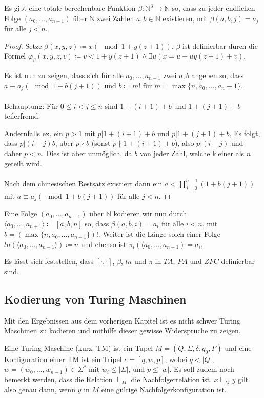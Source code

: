 \begin{lemma}
	Es gibt eine totale berechenbare Funktion $\beta:\mathbb{N}^3\to \mathbb{N}$ so, dass zu jeder endlichen Folge $(a_0,\dots,a_{n-1})$ über $\mathbb{N}$ zwei Zahlen $a,b\in\mathbb{N}$ existieren, mit $\beta(a,b,j)=a_j$ für alle $j<n$.
\end{lemma}
\begin{proof}
	Setze $\beta(x,y,z)\coloneqq x (\mod 1+y(z+1))$. $\beta$ ist definierbar durch die Formel $\varphi_\beta(x,y,z,v)\coloneqq v <1+y(z+1) \land \exists u (x=u+uy(z+1)+v)$.
	
	Es ist nun zu zeigen, dass sich für alle $a_0,\dots,a_{n-1}$ zwei $a,b$ angeben so, dass $a\equiv a_j(\mod 1+b(j+1))$ und $b\coloneqq m!$ für $m=\max\{n,a_0,\dots,a_n-1\}$.
	\\
	\\
	Behauptung: Für $0\leq i < j \leq n$ sind $1+(i+1)+b$ und $1+(j+1)+b$ teilerfremd.
	
	Andernfalls ex. ein $p>1$ mit $p \vert 1+(i+1)+b$ und $p\vert 1+(j+1)+b$.
	Es folgt, dass $p\vert (i-j)b$, aber $p\nmid b$ (sonst $p\nmid 1+(i+1)+b$), also $p\vert(i-j)$ und daher $p<n$. Dies ist aber unmöglich, da $b$ von jeder Zahl, welche kleiner als $n$ geteilt wird.
	\\
	\\
	Nach dem chinesischen Restsatz existiert dann ein $a<\prod^{n-1}_{j=0}(1+b(j+1))$ mit $a\equiv a_j(\mod 1+b(j+1))$ für alle $j<n$.
\end{proof}

Eine Folge $(a_0,\dots,a_{n-1})$ über $\mathbb{N}$ kodieren wir nun durch $\langle a_0,\dots,a_{n+1}\rangle\coloneqq[a,b,n]$ so, dass $\beta(a,b,i)=a_i$ für alle $i<n$, mit $b=(\max\{n,a_0,\dots,a_{n-1}\})!$. Weiter ist die Länge solch einer Folge $ln(\langle a_0,\dots, a_{n-1}\rangle)\coloneqq n$ und ebenso ist $\pi_i(\langle a_0,\dots, a_{n-1})=a_i$.

Es lässt sich feststellen, dass $[\cdot,\cdot]$, $\beta$, $ln$ und $\pi$ in $TA$, $PA$ und $ZFC$ definierbar sind.

\subsection{Kodierung von Turing Maschinen}

Mit den Ergebnissen aus dem vorherigen Kapitel ist es nicht schwer Turing Maschinen zu kodieren und mithilfe dieser gewisse Widersprüche zu zeigen.

Eine Turing Maschine (kurz: TM) ist ein Tupel $M=(Q,\Sigma, \delta, q_0, F)$ und eine Konfiguration einer TM ist ein Tripel $c=[q,w,p]$, wobei $q<\vert Q\vert$, $w=(w_0,\dots,w_{n-1})\in \Sigma^\ast \text{ mit } w_i\leq \vert \Sigma\vert$, und $p\leq \vert w \vert$. Es soll zudem noch bemerkt werden, dass die Relation $\vdash_M$ die Nachfolgerrelation ist. $x\vdash_M y$ gilt also genau dann, wenn $y$ in $M$ eine gültige Nachfolgerkonfiguration ist.

